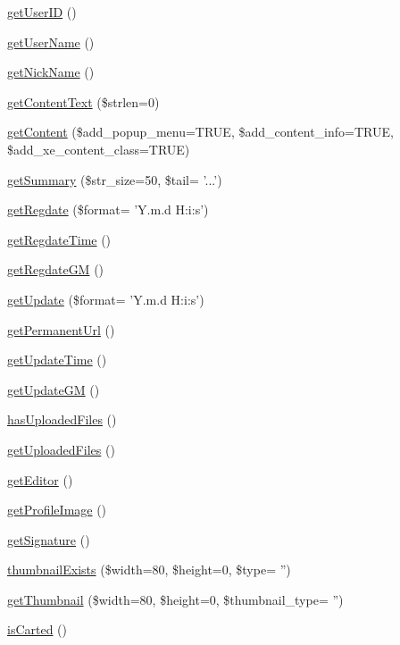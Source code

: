 \begin{DoxyCompactItemize}
\hyperlink{classcommentItem_a5c793e6542e731da5d465c35c77b42fd}{get\+User\+I\+D} ()
\item 
\hyperlink{classcommentItem_a1c35032d37e80ad5018a02787f0091fe}{get\+User\+Name} ()
\item 
\hyperlink{classcommentItem_a097673677cd1c461040cbc9275b7fca9}{get\+Nick\+Name} ()
\item 
\hyperlink{classcommentItem_a5bd758e385068bff00ffc35a0737ff72}{get\+Content\+Text} (\$strlen=0)
\item 
\hyperlink{classcommentItem_afae7151c28cc9066f9c40a010597b25a}{get\+Content} (\$add\+\_\+popup\+\_\+menu=T\+R\+U\+E, \$add\+\_\+content\+\_\+info=T\+R\+U\+E, \$add\+\_\+xe\+\_\+content\+\_\+class=T\+R\+U\+E)
\item 
\hyperlink{classcommentItem_aabe11142b19d831c5e3120e48bb169f7}{get\+Summary} (\$str\+\_\+size=50, \$tail= '...')
\item 
\hyperlink{classcommentItem_acae004be4282c96181e79cc0f3b3adfa}{get\+Regdate} (\$format= 'Y.\+m.\+d H\+:i\+:s')
\item 
\hyperlink{classcommentItem_adb5754f10a245c54a0beb4f6fb22f0e3}{get\+Regdate\+Time} ()
\item 
\hyperlink{classcommentItem_ae5f0203691b6d16a2d99ae40d67adb3f}{get\+Regdate\+G\+M} ()
\item 
\hyperlink{classcommentItem_aa7a413ef04f4c64c779a8bb119a5c214}{get\+Update} (\$format= 'Y.\+m.\+d H\+:i\+:s')
\item 
\hyperlink{classcommentItem_adc6e6a36fd7c02a2f0fecc8a22f9b13b}{get\+Permanent\+Url} ()
\item 
\hyperlink{classcommentItem_a59d0264c1b6842c6a0dfa21a6dfe1edb}{get\+Update\+Time} ()
\item 
\hyperlink{classcommentItem_aab0135e2edd37a47cc390da9b4c79dfa}{get\+Update\+G\+M} ()
\item 
\hyperlink{classcommentItem_abe1774ffe4e8c0f5c14822c5698433da}{has\+Uploaded\+Files} ()
\item 
\hyperlink{classcommentItem_aaa9c1ef5cfd0ce69fd83d8d980360ee5}{get\+Uploaded\+Files} ()
\item 
\hyperlink{classcommentItem_aa27b1c1916b9df510c495655af07bfdf}{get\+Editor} ()
\item 
\hyperlink{classcommentItem_a9baa56f4aa9515c433494778e75c9e85}{get\+Profile\+Image} ()
\item 
\hyperlink{classcommentItem_a97eea3e5359c0ffe84db781d5e5fbff6}{get\+Signature} ()
\item 
\hyperlink{classcommentItem_a1523ec4128cf464d13ca1fb1c2078a0f}{thumbnail\+Exists} (\$width=80, \$height=0, \$type= '')
\item 
\hyperlink{classcommentItem_a9ba96d0703304547c3f494403a86e522}{get\+Thumbnail} (\$width=80, \$height=0, \$thumbnail\+\_\+type= '')
\item 
\hyperlink{classcommentItem_aee548a05480bd060de454017aa8be318}{is\+Carted} ()
\end{DoxyCompactItemize}
